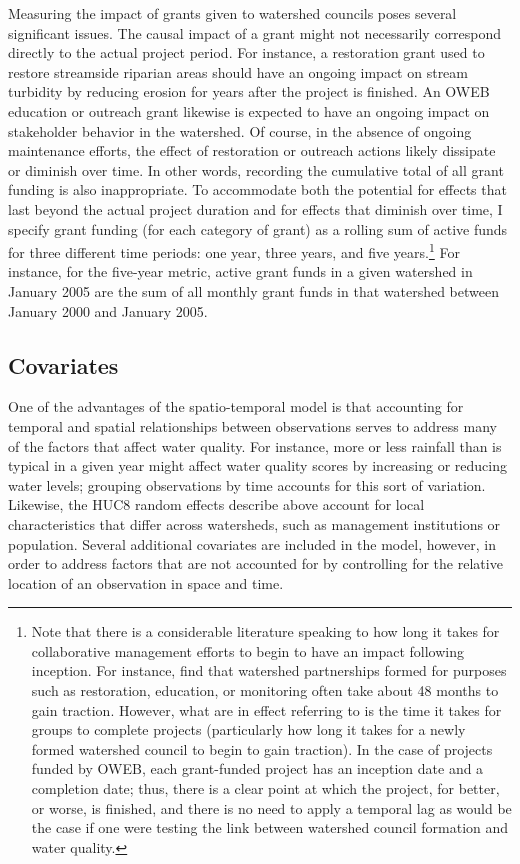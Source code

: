 \documentclass[12pt,a4paper,titlepage]{article}
\begin{document}
Measuring the impact of grants given to watershed councils poses several significant issues. The causal impact of a grant might not necessarily correspond directly to the actual project period. For instance, a restoration grant used to restore streamside riparian areas should have an ongoing impact on stream turbidity by reducing erosion for years after the project is finished. An OWEB education or outreach grant likewise is expected to have an ongoing impact on stakeholder behavior in the watershed. Of course, in the absence of ongoing maintenance efforts, the effect of restoration or outreach actions likely dissipate or diminish over time. In other words, recording the cumulative total of all grant funding is also inappropriate. To accommodate both the potential for effects that last beyond the actual project duration and for effects that diminish over time, I specify grant funding (for each category of grant) as a rolling sum of active funds for three different time periods: one year, three years, and five years.\footnote{Note that there is a considerable literature speaking to how long it takes for collaborative management efforts to begin to have an impact following inception. For instance, \textcite{leach2002} find that watershed partnerships formed for purposes such as restoration, education, or monitoring often take about 48 months to gain traction. However, what \textcite{leach2002} are in effect referring to is the time it takes for groups to complete projects (particularly how long it takes for a newly formed watershed council to begin to gain traction). In the case of projects funded by OWEB, each grant-funded project has an inception date and a completion date; thus, there is a clear point at which the project, for better, or worse, is finished, and there is no need to apply a temporal lag as would be the case if one were testing the link between watershed council formation and water quality.} For instance, for the five-year metric, active grant funds in a given watershed in January 2005 are the sum of all monthly grant funds in that watershed between January 2000 and January 2005.


\subsection*{Covariates}

One of the advantages of the spatio-temporal model is that accounting for temporal and spatial relationships between observations serves to address many of the factors that affect water quality. For instance, more or less rainfall than is typical in a given year might affect water quality scores by increasing or reducing water levels; grouping observations by time accounts for this sort of variation. Likewise, the HUC8 random effects describe above account for local characteristics that differ across watersheds, such as management institutions or population. Several additional covariates are included in the model, however, in order to address factors that are not accounted for by controlling for the relative location of an observation in space and time.
\end{document}
